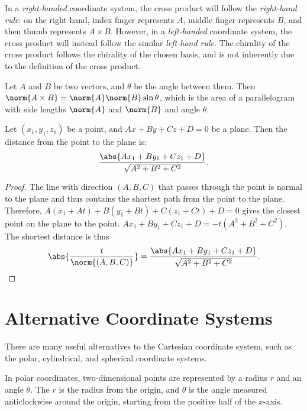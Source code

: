 \documentclass[12pt]{article}
\begin{document}
\begin{rmk}
    In a \emph{right-handed} coordinate system, the cross product will follow the \emph{right-hand rule}: on the right hand, index finger represents $A$, middle finger represents $B$, and then thumb represents $A \times B$. However, in a \emph{left-handed} coordinate system, the cross product will instead follow the similar \emph{left-hand rule}. The chirality of the cross product follows the chirality of the chosen basis, and is not inherently due to the definition of the cross product.
\end{rmk}

\begin{thm}
    Let $A$ and $B$ be two vectors, and $\theta$ be the angle between them. Then $\norm{A \times B} = \norm{A}\norm{B}\sin\theta$, which is the area of a parallelogram with side lengths $\norm{A}$ and $\norm{B}$ and angle $\theta$.
\end{thm}

\begin{thm}
    Let $(x_1, y_1, z_1)$ be a point, and $Ax + By + Cz + D = 0$ be a plane. Then the distance from the point to the plane is: \[\frac{\abs{Ax_1 + By_1 + Cz_1 + D}}{\sqrt{A^2 + B^2 + C^2}}.\]
\end{thm}

\begin{proof}
    The line with direction $(A, B, C)$ that passes through the point is normal to the plane and thus contains the shortest path from the point to the plane. Therefore, $A(x_1 + At) + B(y_1 + Bt) + C(z_1 + Ct) + D = 0$ gives the closest point on the plane to the point. $Ax_1 + By_1 + Cz_1 + D = -t(A^2 + B^2 + C^2)$. The shortest distance is thus \[\abs{\frac{t}{\norm{(A, B, C)}}} = \frac{\abs{Ax_1 + By_1 + Cz_1 + D}}{\sqrt{A^2 + B^2 + C^2}}.\]
\end{proof}

\section{Alternative Coordinate Systems}

There are many useful alternatives to the Cartesian coordinate system, such as the polar, cylindrical, and spherical coordinate systems.

In polar coordinates, two-dimensional points are represented by a radius $r$ and an angle $\theta$. The $r$ is the radius from the origin, and $\theta$ is the angle measured anticlockwise around the origin, starting from the positive half of the $x$-axis.
\end{document}
